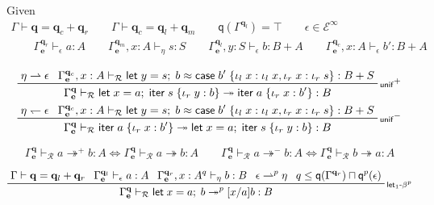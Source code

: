 \documentclass[acmsmall,screen,review]{acmart}
\newcommand{\mc}[1]{\ensuremath{\mathcal{#1}}}
\newcommand{\mb}[1]{\ensuremath{\mathbf{#1}}}
\newcommand{\ms}[1]{\ensuremath{\mathsf{#1}}}
\newcommand{\lto}{:}
\newcommand{\linl}[1]{\iota_l\;{#1}}
\newcommand{\linr}[1]{\iota_r\;{#1}}
\newcommand{\letexpr}[3]{\ensuremath{\ms{let}\;#1 = #2;\;#3}}
\newcommand{\caseexpr}[5]{\ms{case}\;#1\;\{\linl{#2} \lto #3, \linr{#4} \lto #5\}}
\newcommand{\liter}[3]{\ms{iter}\;#1\;\{ \linr{#2} \lto #3 \}}
\newcommand{\einf}[1]{#1 \in \mc{E}^\infty}
\newcommand{\qsp}[4]{#1 \vdash #2 = #3 + #4}
\newcommand{\rle}[1]{{\scriptsize\textsf{#1}}}
\newcommand{\hasty}[4]{#1 \vdash_{#2} #3: {#4}}
\newcommand{\teqv}{\approx}
\newcommand{\tref}{\twoheadrightarrow}
\newcommand{\tmle}[5]{#1 \vdash_{#2} #3 \tref #4 : {#5}}
\newcommand{\tmlep}[6]{#1 \vdash_{#2} #3 \tref^{#6} #4 : {#5}}
\newcommand{\tmeq}[5]{#1 \vdash_{#2} #3 \teqv #4 : {#5}}
\newcommand{\rightmove}{\rightharpoonup}
\newcommand{\leftmove}{\leftharpoondown}
\newcommand{\alquant}{\ms{q}}
\begin{document}
Given
\begin{gather*}
  {\qsp{\Gamma}{\mb{q}}{\mb{q}_c}{\mb{q}_r}} \qquad
  {\qsp{\Gamma}{\mb{q}_c}{\mb{q}_l}{\mb{q}_m}} \qquad
  \alquant(\Gamma^{\mb{q}_l}) = \top \qquad
  \einf{\epsilon}
  \\
  \qquad {\hasty{\Gamma^{\mb{q}_r}_{\mb{e}}}{\epsilon}{a}{A}}
  \qquad {\hasty{\Gamma^{\mb{q}_m}_{\mb{e}}, x : A}{\eta}{s}{S}}
  \qquad {\hasty{\Gamma^{\mb{q}_l}_{\mb{e}}, y : S}{\epsilon}{b}{B + A}}
  \qquad {\hasty{\Gamma^{\mb{q}_c}_{\mb{e}}, x : A}{\epsilon}{b'}{B + A}}
\end{gather*}

\begin{gather*}
  \prftree[r]{\rle{unif}$^+$}
    {\eta \rightmove \epsilon}
    {\tmeq{\Gamma^{\mb{q}_c}_{\mb{e}}, x : A}{\mc{R}}
      {\letexpr{y}{s}{b}}
      {\caseexpr{b'}{x}{\linl{x}}{x}{\linr{s}}}{B + S}}
    {
      \tmle{\Gamma^{\mb{q}}_{\mb{e}}}
        {\mc{R}}
        {\letexpr{x}{a}{\liter{s}{y}{b}}}
        {\liter{a}{x}{b'}}
        {B}
    } \\
  \prftree[r]{\rle{unif}$^-$}
    {\eta \leftmove \epsilon}
    {\tmeq{\Gamma^{\mb{q}_c}_{\mb{e}}, x : A}{\mc{R}}
      {\letexpr{y}{s}{b}}
      {\caseexpr{b'}{x}{\linl{x}}{x}{\linr{s}}}{B + S}}
    {
      \tmle{\Gamma^{\mb{q}}_{\mb{e}}}
        {\mc{R}}
        {\liter{a}{x}{b'}}
        {\letexpr{x}{a}{\liter{s}{y}{b}}}
        {B}
    }
\end{gather*}

\begin{equation*}
  \tmlep{\Gamma^{\mb{q}}_{\mb{e}}}{\mc{R}}{a}{b}{A}{+}
  \iff \tmle{\Gamma^{\mb{q}}_{\mb{e}}}{\mc{R}}{a}{b}{A}
  \qquad
  \tmlep{\Gamma^{\mb{q}}_{\mb{e}}}{\mc{R}}{a}{b}{A}{-}
  \iff \tmle{\Gamma^{\mb{q}}_{\mb{e}}}{\mc{R}}{b}{a}{A}
\end{equation*}

\begin{gather*}
  \prftree[r]{\rle{let$_1$-$\beta^p$}}
    {\qsp{\Gamma}{\mb{q}}{\mb{q}_l}{\mb{q}_r}}
    {\hasty{\Gamma^{\mb{q}_l}_{\mb{e}}}{\epsilon}{a}{A}}
    {\hasty{\Gamma^{\mb{q}_r}_{\mb{e}}, x : A^q}{\eta}{b}{B}}
    {\epsilon \rightmove^p \eta}
    {q \leq \alquant(\Gamma^{\mb{q}_r}) \sqcap \alquant^p(\epsilon)}
    {
      \tmlep{\Gamma^{\mb{q}}_{\mb{e}}}{\mc{R}}{\letexpr{x}{a}{b}}{[x/a]b}{B}{p}
    }
\end{gather*}
\end{document}

